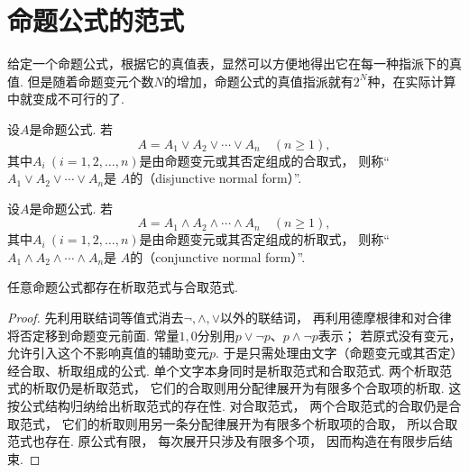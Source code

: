\section{命题公式的范式}
给定一个命题公式，根据它的真值表，显然可以方便地得出它在每一种指派下的真值.
但是随着命题变元个数\(N\)的增加，命题公式的真值指派就有\(2^N\)种，在实际计算中就变成不可行的了.

\begin{definition}
设\(A\)是命题公式.
若\begin{equation*}
	A = A_1 \lor A_2 \lor \dotsb \lor A_n
	\quad(n\geq1),
\end{equation*}
其中\(A_i\ (i=1,2,\dotsc,n)\)是由命题变元或其否定组成的合取式，
则称“\(A_1 \lor A_2 \lor \dotsb \lor A_n\)是
\(A\)的（disjunctive normal form）”.
\end{definition}

\begin{definition}
设\(A\)是命题公式.
若\begin{equation*}
	A = A_1 \land A_2 \land \dotsb \land A_n
	\quad(n\geq1),
\end{equation*}
其中\(A_i\ (i=1,2,\dotsc,n)\)是由命题变元或其否定组成的析取式，
则称“\(A_1 \land A_2 \land \dotsb \land A_n\)是
\(A\)的（conjunctive normal form）”.
\end{definition}

\begin{theorem}
    任意命题公式都存在析取范式与合取范式.
    \begin{proof}
        先利用联结词等值式消去\(\neg,\land,\lor\)以外的联结词，
        再利用德摩根律和对合律将否定移到命题变元前面.
        常量\(1,0\)分别用\(p\lor\neg p\)、\(p\land\neg p\)表示；
        若原式没有变元，
        允许引入这个不影响真值的辅助变元\(p\).
        于是只需处理由文字（命题变元或其否定）经合取、析取组成的公式.
        单个文字本身同时是析取范式和合取范式.
        两个析取范式的析取仍是析取范式，
        它们的合取则用分配律展开为有限多个合取项的析取.
        这按公式结构归纳给出析取范式的存在性.
        对合取范式，
        两个合取范式的合取仍是合取范式，
        它们的析取则用另一条分配律展开为有限多个析取项的合取，
        所以合取范式也存在.
        原公式有限，
        每次展开只涉及有限多个项，
        因而构造在有限步后结束.
    \end{proof}
\end{theorem}

